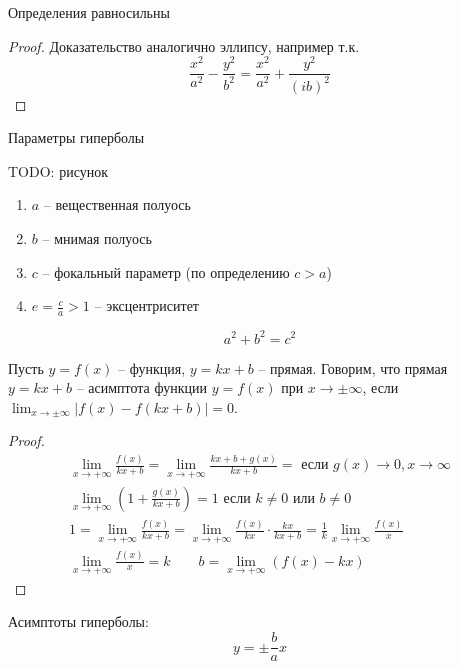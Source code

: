 \begin{theorem}
    Определения равносильны
\end{theorem}
\begin{proof}
    Доказательство аналогично эллипсу, например т.к.
    \[\frac{x^2}{a^2} - \frac{y^2}{b^2} = \frac{x^2}{a^2} + \frac{y^2}{(ib)^2}\]
\end{proof}

Параметры гиперболы


TODO: рисунок

\begin{enumerate}
    \item $a$ -- вещественная полуось
    \item $b$ -- мнимая полуось
    \item $c$ -- фокальный параметр (по определению $c>a$)
    \item $e = \frac{c}{a}>1$ -- эксцентриситет
\end{enumerate}
\[a^2+b^2=c^2\]

\begin{theorem}
    Пусть $y=f(x)$ -- функция, $y=kx+b$ -- прямая. Говорим, что прямая $y=kx+b$ --
    асимптота функции $y=f(x)$ при $x \to \pm \infty$, если
    $\lim_{x \to \pm \infty} |f(x) - f(kx+b)|=0$.
\end{theorem}

\begin{proof}
    \begin{gather*}
        \lim_{x \to + \infty} \frac{f(x)}{kx+b} =  \lim_{x\to + \infty} \frac{kx+b+g(x)}{kx+b}= \text{ если } g(x) \to 0, x\to \infty\\
        \lim_{x \to + \infty} \left(1 + \frac{g(x)}{kx+b}\right) = 1  \text{ если } k\neq 0 \text{ или } b \neq 0\\
        1 = \lim_{x\to + \infty} \frac{f(x)}{kx+b} = \lim_{x\to + \infty} \frac{f(x)}{kx} \cdot \frac{kx}{kx+b} = \frac{1}{k} \lim_{x\to + \infty} \frac{f(x)}{x}\\
        \lim_{x\to +\infty} \frac{f(x)}{x} = k \qquad b = \lim_{x\to + \infty} \left(f(x) - kx\right)
    \end{gather*}
\end{proof}

\begin{theorem}
    Асимптоты гиперболы:
    \[y= \pm \frac{b}{a}x\]
\end{theorem}

